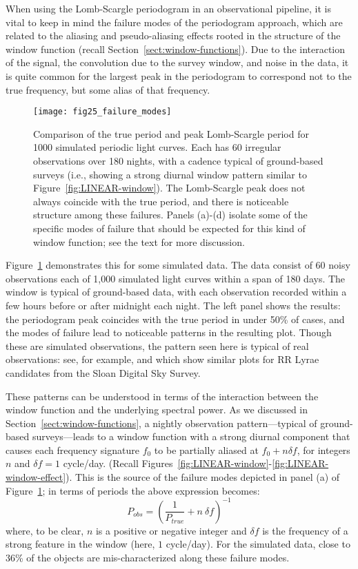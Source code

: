 \documentclass[preprint]{aastex}
\newcommand{\fig}[1]{Figure~\ref{fig:#1}}
\newcommand{\figs}[2]{Figures~\ref{fig:#1}-\ref{fig:#2}}
\newcommand{\figlabel}[1]{\label{fig:#1}}
\newcommand{\eqlabel}[1]{\label{eq:#1}}
\newcommand{\Sect}[1]{Section~\ref{sect:#1}}
\newcommand{\sect}[1]{\Sect{#1}}
\begin{document}
When using the Lomb-Scargle periodogram in an observational pipeline, it is
vital to keep in mind the failure modes of the periodogram approach, which
are related to the aliasing and pseudo-aliasing effects rooted in the structure
of the window function (recall \sect{window-functions}).
Due to the interaction of the signal, the convolution due to the survey window,
and noise in the data, it is quite common for the largest peak in the
periodogram to correspond not to the true frequency, but some alias of that
frequency.

\begin{figure}[ht]
  \centering
  \texttt{[image: fig25\_failure\_modes]}
  \caption{Comparison of the true period and peak Lomb-Scargle period for
    1000 simulated periodic light curves.
    Each has 60 irregular observations over 180 nights,
    with a cadence typical of ground-based surveys (i.e., showing a strong
    diurnal window pattern similar to \fig{LINEAR-window}).
    The Lomb-Scargle peak does not always coincide with the true period,
    and there is noticeable structure among these failures.
    Panels (a)-(d) isolate some of the specific modes of failure that should
    be expected for this kind of window function;
    see the text for more discussion.
    \figlabel{failure-modes}}
\end{figure}

\fig{failure-modes} demonstrates this for some simulated data.
The data consist of 60 noisy observations each of 1,000 simulated light
curves within a span of 180 days.
The window is typical of ground-based data, with each observation recorded
within a few hours before or after midnight each night.
The left panel shows the results: the periodogram peak coincides with the true
period in under 50\% of cases, and the modes of failure lead to noticeable
patterns in the resulting plot.
Though these are simulated observations, the pattern seen here is typical of
real observations: see, for example, \citet{VanderPlas2015}
and \citet{Long2016} which show similar plots for RR Lyrae candidates from
the Sloan Digital Sky Survey.

These patterns can be understood in terms of the interaction between the
window function and the underlying spectral power.
As we discussed in \sect{window-functions},
a nightly observation pattern---typical of ground-based surveys---leads to
a window function with a strong diurnal component that causes each frequency
signature $f_0$ to be partially aliased at $f_0 + n \delta f$, for integers
$n$ and $\delta f = 1$ cycle/day.
(Recall \figs{LINEAR-window}{LINEAR-window-effect}).
This is the source of the failure modes depicted in panel (a) of
\fig{failure-modes}; in terms of periods the above expression becomes:
\begin{equation}
  P_{obs} = \left(\frac{1}{P_{true}} + n\ \delta f\right)^{-1}
  \eqlabel{alias-periods}
\end{equation}
where, to be clear, $n$ is a positive or negative integer and $\delta f$ is
the frequency of a strong feature in the window  (here, $1$ cycle/day).
For the simulated data, close to 36\% of the objects are mis-characterized
along these failure modes.
\end{document}
